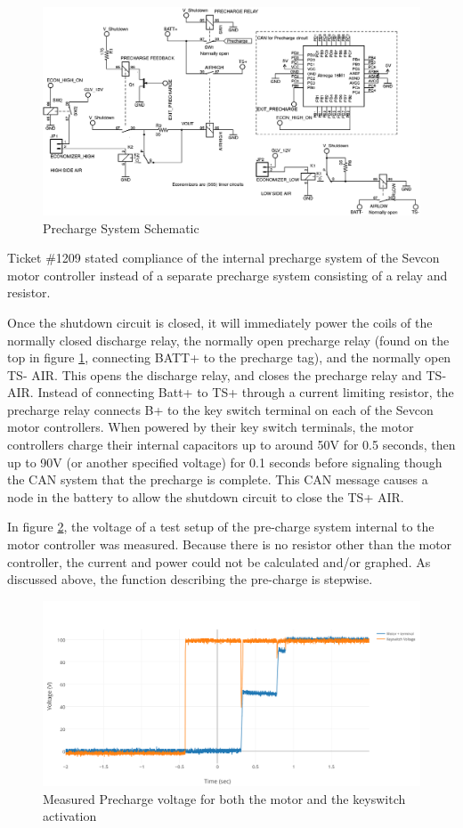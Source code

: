 \documentclass{article}
\begin{document}

    \begin{figure}[H]
        \centering
        \includegraphics[width = 0.7 \textwidth]{precharge}
        \caption{Precharge System Schematic}
        \label{prechargeschem}
    \end{figure}


    Ticket \#1209 stated compliance of the internal precharge system of the Sevcon motor controller instead of a separate precharge system consisting of a relay and resistor.

    Once the shutdown circuit is closed, it will immediately power the coils of the normally closed discharge relay, the normally open precharge relay (found on the top in figure \ref{prechargeschem}, connecting BATT+ to the precharge tag), and the normally open TS- AIR. This opens the discharge relay, and closes the precharge relay and TS- AIR. Instead of connecting Batt+ to TS+ through a current limiting resistor, the precharge relay connects B+ to the key switch terminal on each of the Sevcon motor controllers. When powered by their key switch terminals, the motor controllers charge their internal capacitors up to around 50V for 0.5 seconds, then up to 90V (or another specified voltage) for 0.1 seconds before signaling though the CAN system that the precharge is complete. This CAN message causes a node in the battery to allow the shutdown circuit to close the TS+ AIR.

    In figure \ref{prechargemeasurements}, the voltage of a test setup of the pre-charge system internal to the motor controller was measured. Because there is no resistor other than the motor controller, the current and power could not be calculated and/or graphed. As discussed above, the function describing the pre-charge is stepwise.

        \begin{figure}[H]
        \centering
        \includegraphics[width = 0.8 \textwidth]{PrechargeVoltage}
        \caption{Measured Precharge voltage for both the motor and the keyswitch activation}
        \label{prechargemeasurements}
    \end{figure}
\end{document}
